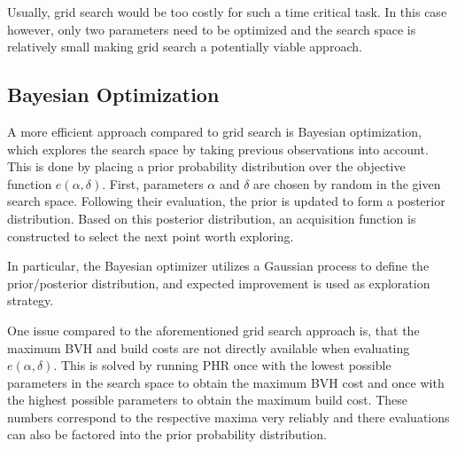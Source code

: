 Usually, grid search would be too costly for such a time critical task. In this case however, only two parameters need to be optimized and the search space is relatively small making grid search a potentially viable approach. 

\subsection{Bayesian Optimization}
A more efficient approach compared to grid search is Bayesian optimization\cite{pelikan99boa}, which explores the search space by taking previous observations into account. This is done by placing a prior probability distribution over the objective function $e(\alpha,\delta)$. First, parameters $\alpha$ and $\delta$ are chosen by random in the given search space. Following their evaluation, the prior is updated to form a posterior distribution. Based on this posterior distribution, an acquisition function is constructed to select the next point worth exploring. 

In particular, the Bayesian optimizer\cite{ou19bo} utilizes a Gaussian process to define the prior/posterior distribution, and expected improvement is used as exploration strategy.

One issue compared to the aforementioned grid search approach is, that the maximum BVH and build costs are not directly available when evaluating $e(\alpha,\delta)$. This is solved by running PHR once with the lowest possible parameters in the search space to obtain the maximum BVH cost and once with the highest possible parameters to obtain the maximum build cost. These numbers correspond to the respective maxima very reliably and there evaluations can also be factored into the prior probability distribution.
\cleardoublepage